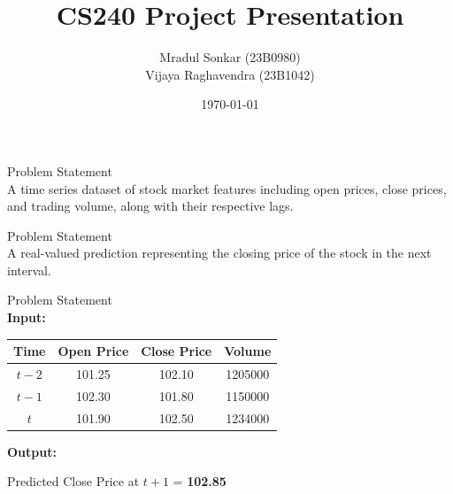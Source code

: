 \documentclass[9pt]{beamer}
\title{CS240 Project Presentation}
\author{Mradul Sonkar (23B0980)\\ Vijaya Raghavendra (23B1042)}
\date{\today}
\begin{document}
\maketitle

\begin{frame}{Problem Statement}
    \\[0.2cm]
    A time series dataset of stock market features including
    open prices, close prices, and trading volume, along with their respective
    lags.
\end{frame}

\begin{frame}{Problem Statement}
    \\[0.2cm]
    A real-valued prediction representing the closing price of
    the stock in the next interval.
\end{frame}

\begin{frame}{Problem Statement}
    \\[0.3cm]

    \textbf{Input:}
    \begin{table}[h!]
        \centering
        \begin{tabular}{|c|c|c|c|}
            \hline
            \textbf{Time} & \textbf{Open Price} & \textbf{Close Price} &
            \textbf{Volume}
            \\
            \hline
            $t-2$         & 101.25              & 102.10               &
            1205000                                                      \\
            $t-1$         & 102.30              & 101.80               &
            1150000                                                      \\
            $t$           & 101.90              & 102.50               &
            1234000                                                      \\
            \hline
        \end{tabular}
    \end{table}

    \textbf{Output:}\\
    \begin{center}
        Predicted Close Price at $t+1$ = \textbf{102.85}
    \end{center}

\end{frame}
\end{document}
